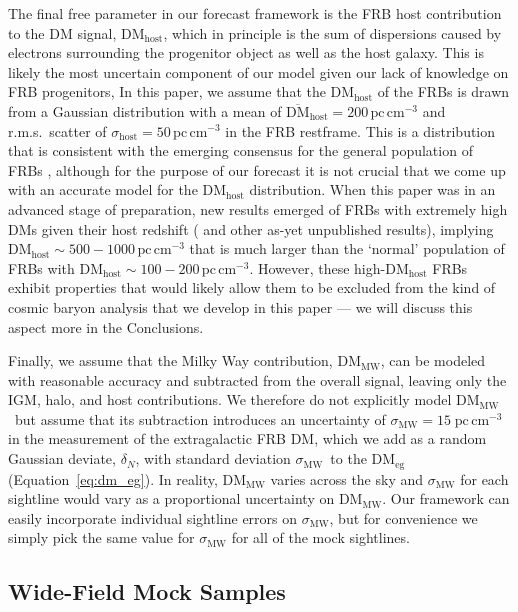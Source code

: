 \documentclass[twocolumn]{aastex63}
\newcommand{\dmmw}{\ensuremath{\mathrm{DM}_\mathrm{MW}}}
\newcommand{\dmhost}{\ensuremath{\mathrm{DM}_\mathrm{host}}}
\newcommand{\bardmhost}{\ensuremath{\overline{\mathrm{DM}}_\mathrm{host}}}
\newcommand{\pccmcube}{\ensuremath{\mathrm{pc}\,\mathrm{cm}^{-3}}}
\newcommand{\sigmw}{\ensuremath{\sigma_\mathrm{MW}}}
\begin{document}
\begin{CJK*}{UTF8}{gbsn}
The final free parameter in our forecast framework is the FRB host contribution to the DM signal, \dmhost, which in principle is
the sum of dispersions caused by electrons surrounding the progenitor object as well
as the host galaxy. This is likely the most uncertain component of our model given our lack of knowledge
on FRB progenitors, 
In this paper, we assume that the \dmhost{} of the FRBs is drawn from a Gaussian distribution
with a mean of $\bardmhost = 200\,\pccmcube$ and r.m.s.\ scatter of $\sigma_\mathrm{host} = 50\,\pccmcube$ in the FRB restframe. 
This is a distribution that is consistent with the emerging consensus for the general population of FRBs \citep{james:2021, cordes:2021}, 
although for the purpose of our
forecast it is not crucial that we come up with an accurate model for the \dmhost{} distribution.
When this paper was in an advanced stage of preparation, new results emerged of
FRBs with extremely high DMs given their host redshift (\citealt{niu:2021} and other as-yet
unpublished results), implying $\dmhost \sim 500-1000\,\pccmcube$ that is much larger than the `normal' population of FRBs with $\dmhost \sim 100-200\, \pccmcube$.
However, these high-\dmhost{} FRBs exhibit properties that would likely allow them to be excluded from the kind of 
cosmic baryon analysis that we develop in this paper --- we will discuss this aspect more in the Conclusions.


Finally, we assume that the Milky Way contribution, \dmmw, can be modeled with 
reasonable accuracy and subtracted from the overall signal, leaving only the IGM, halo, and host contributions.
We therefore do not explicitly model \dmmw\ but assume that its subtraction introduces an uncertainty of $\sigmw = 15\; \pccmcube$ in the measurement of 
the extragalactic FRB DM, which we add as a random Gaussian deviate, $\delta_N$, with standard deviation \sigmw\ to the $\mathrm{DM}_\mathrm{eg}$ (Equation~\ref{eq:dm_eg}). In reality, \dmmw{} varies across the sky and \sigmw{} for each sightline 
would vary as a proportional uncertainty on \dmmw. Our framework can easily incorporate individual sightline errors on \sigmw{}, but for convenience we simply pick the same value for
\sigmw{} for all of the mock sightlines.

\subsection{Wide-Field Mock Samples}
\label{sec:specmocks}


\end{CJK*}
\end{document}
